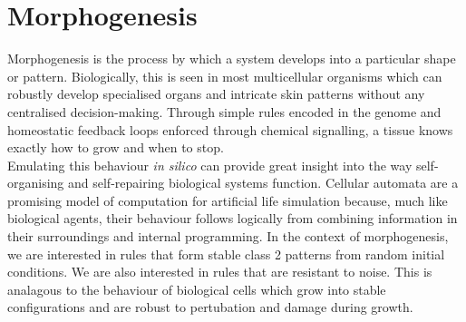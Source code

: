 \section{Morphogenesis}
Morphogenesis is the process by which a system develops into a particular shape or pattern. 
Biologically, this is seen in most multicellular organisms which can robustly develop specialised organs and intricate skin patterns without any centralised decision-making.
Through simple rules encoded in the genome and homeostatic feedback loops enforced through chemical signalling, a tissue knows exactly how to grow and when to stop.\\

Emulating this behaviour \textit{in silico} can provide great insight into the way self-organising and self-repairing biological systems function.
Cellular automata are a promising model of computation for artificial life simulation because, much like biological agents, their behaviour follows logically from combining information in their surroundings and internal programming.
In the context of morphogenesis, we are interested in rules that form stable class 2 patterns from random initial conditions.
We are also interested in rules that are resistant to noise.
This is analagous to the behaviour of biological cells which grow into stable configurations and are robust to pertubation and damage during growth.



